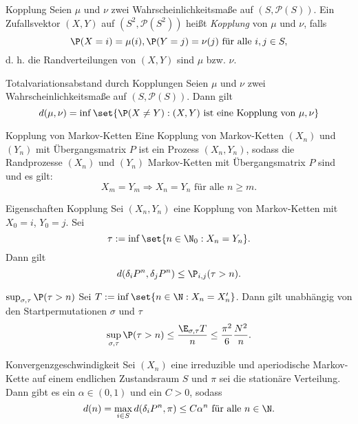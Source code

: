 \begin{karte}{Kopplung}
    Seien \(\mu\) und \(\nu\) zwei Wahrscheinlichkeitsmaße auf \((S,\mathcal{P}(S))\). 
    Ein Zufallsvektor \((X,Y)\) auf \((S^2, \mathcal{P}(S^2))\) heißt \textit{Kopplung} 
    von \(\mu\) und \(\nu\), falls 
    \[ \P(X=i) = \mu(i), \P(Y=j)=\nu(j) \text{ für alle } i,j\in S, \]
    d. h. die Randverteilungen von \((X,Y)\) sind \(\mu\) bzw. \(\nu\).
\end{karte}

\begin{karte}{Totalvariationsabstand durch Kopplungen}
    Seien \(\mu\) und \(\nu\) zwei Wahrscheinlichkeitsmaße auf \((S,\mathcal{P}(S))\). 
    Dann gilt 
    \[ d(\mu,\nu) = \inf \set{\P(X\neq Y) : (X,Y) \text{ ist eine Kopplung von } \mu,\nu} \]
\end{karte}

\begin{karte}{Kopplung von Markov-Ketten}
    Eine Kopplung von Markov-Ketten \((X_n)\) und \((Y_n)\) mit Übergangsmatrix 
    \(P\) ist ein Prozess \((X_n,Y_n)\), sodass die Randprozesse \((X_n)\) und \((Y_n)\)
    Markov-Ketten mit Übergangsmatrix \(P\) sind und es gilt: 
    \[ X_m = Y_m \Rightarrow X_n = Y_n \text{ für alle } n\geq m. \]
\end{karte}

\begin{karte}{Eigenschaften Kopplung} %
    Sei \((X_n,Y_n)\) eine Kopplung von Markov-Ketten mit \(X_0 = i\), 
    \(Y_0 = j\). Sei 
    \[ \tau := \inf \set{n\in \N_0: X_n = Y_n}. \]
    Dann gilt 
    \[ d(\delta_i P^n, \delta_j P^n) \leq \P_{i,j}(\tau > n). \]
\end{karte}

\begin{karte}{\( \sup_{\sigma,\tau} \P(\tau > n) \)}
    Sei \(T := \inf \set{n\in \N: X_n = X_n'}\). Dann gilt unabhängig von den Startpermutationen \(\sigma\) 
    und \(\tau\)
    \[ \sup_{\sigma,\tau} \P(\tau > n) \leq \frac{\E_{\sigma,\tau} T}{n} 
    \leq \frac{\pi^2}{6} \frac{N^2}{n}. \]
\end{karte}

\begin{karte}{Konvergenzgeschwindigkeit}
    Sei \((X_n)\) eine irreduzible und aperiodische Markov-Kette auf 
    einem endlichen Zustandsraum \(S\) und \(\pi\) sei die stationäre Verteilung. 
    Dann gibt es ein \(\alpha \in (0,1)\) und ein \(C>0\), sodass
    \[ d(n) = \max_{i\in S} d(\delta_i P^n, \pi) \leq C \alpha^n \text{ für alle } n\in\N. \]
\end{karte}
